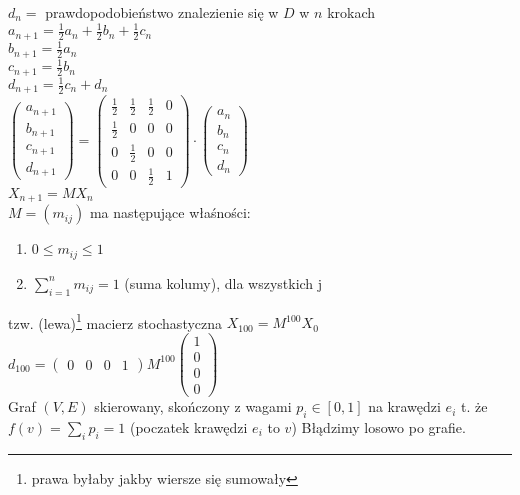 \documentclass[10pt]{article}
\theoremstyle{definition}
\theoremstyle{definition}
\theoremstyle{definition}
\theoremstyle{definition}
\theoremstyle{remark}
\theoremstyle{definition}
\theoremstyle{definition}
\theoremstyle{definition}
\theoremstyle{definition}
\theoremstyle{definition}
\begin{document}
$d_n=$ prawdopodobieństwo znalezienie się w $D$ w $n$ krokach  \\ 
$a_{n+1} = \frac{1}{2} a_n + \frac{1}{2} b_n + \frac{1}{2} c_n$ \\ 
$b_{n+1} = \frac{1}{2} a_n$ \\ 
$c_{n+1} = \frac{1}{2} b_n$ \\ 
$d_{n+1} = \frac{1}{2} c_n + d_n$ \\
$\begin{pmatrix} a_{n+1} \\ b_{n+1} \\ c_{n+1} \\ d_{n+1} \end{pmatrix} = 
\begin{pmatrix} \frac{1}{2} & \frac{1}{2} & \frac{1}{2} & 0 \\ 
                \frac{1}{2} & 0 & 0 & 0 \\ 
                0 & \frac{1}{2} & 0 & 0 \\ 
            0 & 0 & \frac{1}{2} & 1 \end{pmatrix} \cdot 
            \begin{pmatrix} a_n \\ b_n \\ c_n \\ d_n \end{pmatrix}$ \\ 
$X_{n+1} = M X_n$ \\ 
$M = (m_{ij})$ ma następujące właśności: 
\begin{enumerate} 
    \item $0 \le m_{ij} \le 1$ 
    \item $\sum\limits_{i=1}^n m_{ij} = 1$ (suma kolumy), dla wszystkich j
\end{enumerate} 
tzw. (lewa)\footnote{prawa byłaby jakby wiersze się sumowały} macierz stochastyczna 
$X_{100} = M^{100} X_0$ \\ 
$d_{100} = \begin{pmatrix} 0 & 0 & 0 & 1 \end{pmatrix} M^{100} \begin{pmatrix} 1 \\ 0 \\ 0 \\ 0 \end{pmatrix}$ \\
Graf $(V,E)$ skierowany, skończony z wagami $p_i \in [0,1]$ na krawędzi $e_i$ t. że 
$f(v) = \sum\limits_i p_i = 1$ (poczatek krawędzi $e_i$ to $v$)
Błądzimy losowo po grafie.
\end{document}
